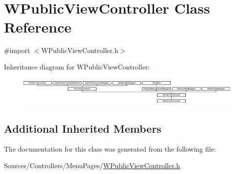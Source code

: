 \hypertarget{interface_w_public_view_controller}{\section{W\-Public\-View\-Controller Class Reference}
\label{interface_w_public_view_controller}
}


{\ttfamily \#import $<$W\-Public\-View\-Controller.\-h$>$}

Inheritance diagram for W\-Public\-View\-Controller\-:\begin{figure}[H]
\begin{center}
\leavevmode
\includegraphics[height=1.447964cm]{interface_w_public_view_controller}
\end{center}
\end{figure}
\subsection*{Additional Inherited Members}


The documentation for this class was generated from the following file\-:\begin{DoxyCompactItemize}
\item 
Sources/\-Controllers/\-Menu\-Pages/\hyperlink{_w_public_view_controller_8h}{W\-Public\-View\-Controller.\-h}\end{DoxyCompactItemize}
